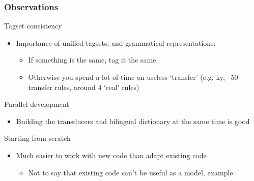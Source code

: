 \documentclass[10pt,xetex]{beamer} %
\begin{document}
\begin{frame}
  \frametitle{Observations}

\begin{block}{Tagset consistency}
  \begin{itemize}
    \item Importance of unified tagsets, and grammatical representations:
    \begin{itemize}
      \item If something is the same, tag it the same.
      \item Otherwise you spend a lot of time on useless `transfer'
        (e.g. ky, ~50 transfer rules, around 4 `real' rules)
    \end{itemize}
  \end{itemize}
\end{block}

\begin{block}{Parallel development}
  \begin{itemize}
    \item Building the transducers and bilingual dictionary at the same time is good
  \end{itemize}
\end{block}

\begin{block}{Starting from scratch}
  \begin{itemize}
    \item Much easier to work with new code than adapt existing code
    \begin{itemize}
      \item Not to say that existing code can't be useful as a model, example
    \end{itemize}
  \end{itemize}
\end{block}

\end{frame}

\end{document}
